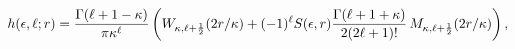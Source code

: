 \[\mathop{h\/}\nolimits\!\left(\epsilon,\ell;r\right)=\frac{\mathop{\Gamma\/}%
\nolimits\!\left(\ell+1-\kappa\right)}{\pi\kappa^{\ell}}\left(\mathop{W_{%
\kappa,\ell+\frac{1}{2}}\/}\nolimits\!\left(2r/\kappa\right)+(-1)^{\ell}S(%
\epsilon,r)\frac{\mathop{\Gamma\/}\nolimits\!\left(\ell+1+\kappa\right)}{2(2%
\ell+1)!}\mathop{M_{\kappa,\ell+\frac{1}{2}}\/}\nolimits\!\left(2r/\kappa%
\right)\right),\]